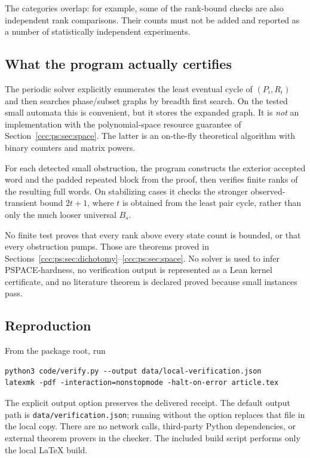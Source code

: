 \documentclass[11pt,letterpaper]{article}
\theoremstyle{definition}
\theoremstyle{remark}
\begin{document}
The categories overlap: for example, some of the rank-bound checks are
also independent rank comparisons. Their counts must not be added and
reported as a number of statistically independent experiments.

\subsection{What the program actually certifies}

The periodic solver explicitly enumerates the least eventual cycle of
$(P_i,R_i)$ and then searches phase/subset graphs by breadth first search.
On the tested small automata this is convenient, but it stores the
expanded graph. It is \emph{not} an implementation with the polynomial-space
resource guarantee of Section~\ref{ccc:ps:sec:space}. The latter is an
on-the-fly theoretical algorithm with binary counters and matrix powers.

For each detected small obstruction, the program constructs the exterior
accepted word and the padded repeated block from the proof, then verifies
finite ranks of the resulting full words. On stabilizing cases it checks
the stronger observed-transient bound $2t+1$, where $t$ is obtained from
the least pair cycle, rather than only the much looser universal $B_s$.

No finite test proves that every rank above every state count is bounded,
or that every obstruction pumps. Those are theorems proved in
Sections~\ref{ccc:ps:sec:dichotomy}--\ref{ccc:ps:sec:space}. No solver is used to infer
PSPACE-hardness, no verification output is represented as a Lean kernel
certificate, and no literature theorem is declared proved because small
instances pass.

\subsection{Reproduction}

From the package root, run
\begin{lstlisting}
python3 code/verify.py --output data/local-verification.json
latexmk -pdf -interaction=nonstopmode -halt-on-error article.tex
\end{lstlisting}
The explicit output option preserves the delivered receipt. The default
output path is \nolinkurl{data/verification.json}; running without the
option replaces that file in the local copy. There are no network calls,
third-party Python dependencies, or external theorem provers in the
checker. The included build script performs only the local LaTeX build.
\end{document}
